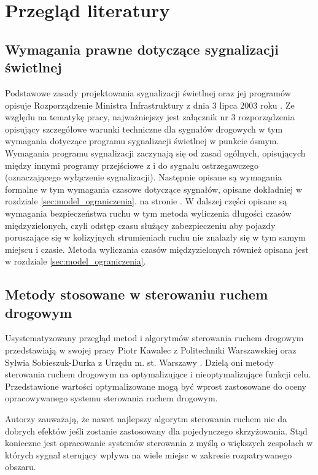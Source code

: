 \chapter{Przegląd literatury}
\section{Wymagania prawne dotyczące sygnalizacji świetlnej}
Podstawowe zasady projektowania sygnalizacji świetlnej oraz jej programów opisuje Rozporządzenie Ministra Infrastruktury z dnia 3 lipca 2003 roku \cite{rozporzadzenie}.
Ze względu na tematykę pracy, najważniejszy jest załącznik nr 3 rozporządzenia opisujący szczegółowe warunki techniczne dla sygnałów drogowych w tym wymagania dotyczące programu sygnalizacji świetlnej w punkcie ósmym.
Wymagania programu sygnalizacji zaczynają się od zasad ogólnych, opisujących między innymi programy przejściowe z i do sygnału ostrzegawczego (oznaczającego wyłączenie sygnalizacji). Następnie opisane są wymagania formalne w tym wymagania czasowe dotyczące sygnałów, opisane dokładniej w rozdziale \ref{sec:model_ograniczenia}. na stronie \pageref{sec:model_ograniczenia}.
W dalszej części opisane są wymagania bezpieczeństwa ruchu w tym metoda wyliczenia długości czasów międzyzielonych, czyli odstęp czasu służący zabezpieczeniu aby pojazdy poruszające się w kolizyjnych strumieniach ruchu nie znalazły się w tym samym miejscu i czasie. Metoda wyliczania czasów międzyzielonych również opisana jest w rozdziale \ref{sec:model_ograniczenia}.

\section{Metody stosowane w sterowaniu ruchem drogowym}
Usystematyzowany przegląd metod i algorytmów sterowania ruchem drogowym przedstawiają w swojej pracy Piotr Kawalec z Politechniki Warszawskiej oraz Sylwia Sobieszuk\--Durka z Urzędu m. st. Warszawy \cite{kawalec+sobieszuk-durka}. Dzielą oni metody sterowania ruchem drogowym na optymalizujące i nieoptymalizujące funkcji celu.
Przedstawione wartości optymalizowane mogą być wprost zastosowane do oceny opracowywanego systemu sterowania ruchem drogowym.

Autorzy zauważają, że nawet najlepszy algorytm sterowania ruchem nie da dobrych efektów jeśli zostanie zastosowany dla pojedynczego skrzyżowania. Stąd konieczne jest opracowanie systemów sterowania z myślą o większych zespołach w których sygnał sterujący wpływa na wiele miejsc w zakresie rozpatrywanego obszaru.


